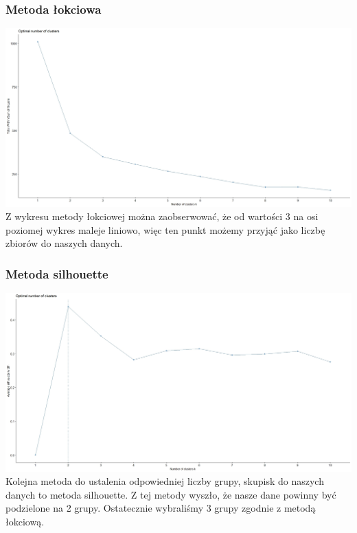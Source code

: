 \documentclass{article}
\begin{document}
        \subsubsection{Metoda łokciowa}
            \includegraphics[width=\textwidth]{elbow_fig.jpeg}
            Z wykresu metody łokciowej można zaobserwować, że od wartości 3 na osi poziomej 
            wykres maleje liniowo, więc ten punkt możemy przyjąć jako liczbę zbiorów do 
            naszych danych.
        \subsubsection{Metoda silhouette}
            \includegraphics[width=\textwidth]{silhouette_fig.jpeg}
            Kolejna metoda do ustalenia odpowiedniej liczby grupy, skupisk do naszych danych to metoda silhouette. 
            Z tej metody wyszło, że nasze dane powinny być podzielone na 2 grupy. 
            \newline\newline Ostatecznie wybraliśmy 3 grupy zgodnie z metodą łokciową.
    
\end{document}
